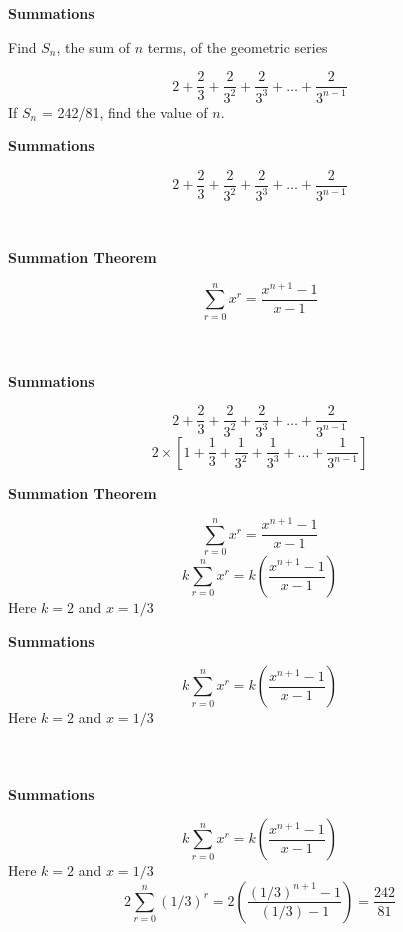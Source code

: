 

\noindent\textbf{Summations}

Find $S_n$, the sum of $n$ terms, of the geometric series

\[  2 + \frac{2}{3} + \frac{2}{3^2} + \frac{2}{3^3} +  \ldots + \frac{2}{3^{n-1}} \]
\bigskip
If $S_n$ = 242/81, find the value of $n$.





\noindent\textbf{Summations}

\[  2 + \frac{2}{3} + \frac{2}{3^2} + \frac{2}{3^3} +  \ldots + \frac{2}{3^{n-1}} \]
\[ \phantom{ 2 \times \left[ 1 + \frac{1}{3} + \frac{1}{3^2} + \frac{1}{3^3} +  \ldots + \frac{1}{3^{n-1}}   \right]  } \]


\textbf{Summation Theorem}

\[ \sum^{n}_{r=0} x^r = \frac{x^{n+1}-1}{x-1} \]
\[ \phantom{k \sum^{n}_{r=0} x^r = k \frac{x^{n+1}-1}{x-1}  } \]
\phantom{Here $k=2$ and $x = 1/3$ }






\noindent\textbf{Summations}

\[  2 + \frac{2}{3} + \frac{2}{3^2} + \frac{2}{3^3} +  \ldots + \frac{2}{3^{n-1}} \]
\[  2 \times \left[ 1 + \frac{1}{3} + \frac{1}{3^2} + \frac{1}{3^3} +  \ldots + \frac{1}{3^{n-1}}   \right] \]

\textbf{Summation Theorem}

\[ \sum^{n}_{r=0} x^r = \frac{x^{n+1}-1}{x-1} \]
\[ k  \sum^{n}_{r=0} x^r  =  k \left( \frac{x^{n+1}-1}{x-1} \right) \]
Here $k=2$ and $x = 1/3$ 





\noindent\textbf{Summations}


\[ k  \sum^{n}_{r=0} x^r  =  k \left( \frac{x^{n+1}-1}{x-1} \right) \]
Here $k=2$ and $x = 1/3$ 
\[  \phantom{ 2  \sum^{n}_{r=0} (1/3)^r  =  2 \left( \frac{(1/3)^{n+1}-1}{(1/3)-1} \right) } \]





\noindent\textbf{Summations}


\[ k  \sum^{n}_{r=0} x^r  =  k \left( \frac{x^{n+1}-1}{x-1} \right) \]
Here $k=2$ and $x = 1/3$ 
\[  2  \sum^{n}_{r=0} (1/3)^r  =  2 \left( \frac{(1/3)^{n+1}-1}{(1/3)-1} \right)  = \frac{242}{81} \]



